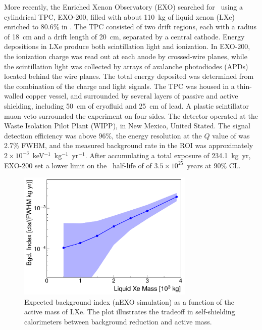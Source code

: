 More recently, the Enriched Xenon Observatory (EXO) searched for \bbonu\ using a cylindrical TPC, EXO-200, filled with about 110~kg of liquid xenon (LXe) enriched to 80.6\% in  \cite{EXO-200:2019rkq}. The TPC consisted of two drift regions, each with a radius of 18~cm and a drift length of 20~cm, separated by a central cathode. Energy depositions in LXe produce both scintillation light and ionization. In EXO-200, the ionization charge was read out at each anode by crossed-wire planes, while the scintillation light was collected by arrays of avalanche photodiodes (APDs) located behind the wire planes. The total energy deposited was determined from the combination of the charge and light signals. The TPC was housed in a thin-walled copper vessel, and surrounded by several layers of passive and active shielding, including 50~cm of cryofluid and 25~cm of lead. A plastic scintillator muon veto surrounded the experiment on four sides. The detector operated at the Waste Isolation Pilot Plant (WIPP), in New Mexico, United Stated. The signal detection efficiency was above 96\%, the energy resolution at the $Q$ value of  was 2.7\% FWHM, and the measured background rate in the ROI was approximately $2\times10^{-3}$~keV$^{-1}$~kg$^{-1}$~yr$^{-1}$. After accumulating a total exposure of 234.1~kg~yr, EXO-200 set a lower limit on the \bbonu\ half-life of  of $3.5\times10^{25}$~years at 90\% CL.

\begin{figure}[t!b!]
\begin{center}
\includegraphics[width=0.75\textwidth]{img/nexo}
\end{center}
\caption{Expected background index (nEXO simulation) as a function of the active mass of LXe. The plot illustrates the tradeoff in self-shielding calorimeters between background reduction and active mass. } \label{fig:nexo}
\end{figure}


